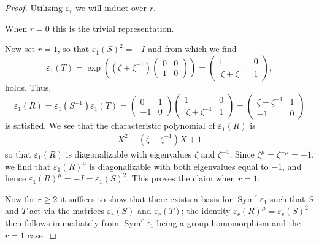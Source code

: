 \documentclass[11pt]{article}
\DeclareMathOperator{\Sym}{Sym}
\begin{document}
\begin{proof}
    Utilizing $ \varepsilon_r$ we will induct over $r$.  
    
    When $r=0$ this is the trivial representation. 
    
    Now set $r=1$, so that $\varepsilon_1(S)^2 = -I$ and from which we find
    \[
    \varepsilon_1(T) = \exp\!\left((\zeta+\zeta^{-1})\left(\begin{smallmatrix}
        0&0\\
        1&0
    \end{smallmatrix}\right)\right) = \left(\begin{matrix}
        1&0\\\
        \zeta+\zeta^{-1}&1
    \end{matrix}\right),
    \]
    holds. Thus,
    \[
    \varepsilon_1(R) = \varepsilon_1(S^{-1})\varepsilon_1(T) = \left(\begin{matrix}
        0&1\\
        -1&0
    \end{matrix}\right)\left(\begin{matrix}
        1&0\\\
        \zeta+\zeta^{-1}&1
    \end{matrix}\right) = \left(\begin{matrix}
        \zeta+\zeta^{-1}&1\\
        -1&0
    \end{matrix}\right)
    \]
    is satisfied. We see that the characteristic polynomial of $\varepsilon_1(R)$ is 
        \begin{eqnarray*}
            X^2-(\zeta+\zeta^{-1})X+1
        \end{eqnarray*}
    so that $\varepsilon_1(R)$ is diagonalizable with eigenvalues $\zeta$ and $\zeta^{-1}$. Since $ \zeta^\mu =\zeta^{-\mu}=-1$, we find that $\varepsilon_1(R)^\mu$ is diagonalizable with both eigenvalues equal to $-1$, and hence $\varepsilon_1(R)^\mu = -I = \varepsilon_1(S)^2$. This proves the claim when $r=1$.

    Now for $r\geq 2$ it suffices to show that there exists a basis for $\Sym^r\varepsilon_1$ such that $ S$ and $ T $ act via the matrices $\varepsilon_r(S)$ and $\varepsilon_r(T)$; the identity $\varepsilon_r(R)^\mu = \varepsilon_r(S)^2$ then follows immediately from $\Sym^r\varepsilon_1 $ being a group homomorphism and the $r=1$ case. 
    

\end{proof}
\end{document}
